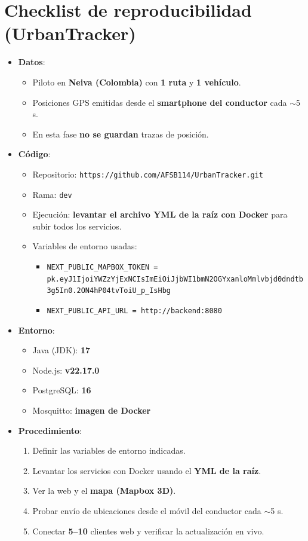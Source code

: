 \appendix
\section{Checklist de reproducibilidad (UrbanTracker)}
\begin{itemize}[leftmargin=*]
  \item \textbf{Datos}:
    \begin{itemize}
      \item Piloto en \textbf{Neiva (Colombia)} con \textbf{1 ruta} y \textbf{1 vehículo}.
      \item Posiciones GPS emitidas desde el \textbf{smartphone del conductor} cada \(\sim\)5 s.
      \item En esta fase \textbf{no se guardan} trazas de posición.
    \end{itemize}

  \item \textbf{Código}:
    \begin{itemize}
      \item Repositorio: \texttt{https://github.com/AFSB114/UrbanTracker.git}
      \item Rama: \texttt{dev}
      \item Ejecución: \textbf{levantar el archivo YML de la raíz con Docker} para subir todos los servicios.
      \item Variables de entorno usadas:
        \begin{itemize}
          \item \texttt{NEXT\_PUBLIC\_MAPBOX\_TOKEN = pk.eyJ1IjoiYWZzYjExNCIsImEiOiJjbWI1bmN2OGYxanloMmlvbjd0dndtb3g5In0.2ON4hP04tvToiU\_p\_IsHbg}
          \item \texttt{NEXT\_PUBLIC\_API\_URL = http://backend:8080}
        \end{itemize}
    \end{itemize}

  \item \textbf{Entorno}:
    \begin{itemize}
      \item Java (JDK): \textbf{17}
      \item Node.js: \textbf{v22.17.0}
      \item PostgreSQL: \textbf{16}
      \item Mosquitto: \textbf{imagen de Docker}
    \end{itemize}

  \item \textbf{Procedimiento}:
    \begin{enumerate}
      \item Definir las variables de entorno indicadas.
      \item Levantar los servicios con Docker usando el \textbf{YML de la raíz}.
      \item Ver la web y el \textbf{mapa (Mapbox 3D)}.
      \item Probar envío de ubicaciones desde el móvil del conductor cada \(\sim\)5 s.
      \item Conectar \textbf{5–10} clientes web y verificar la actualización en vivo.
    \end{enumerate}


\end{itemize}
